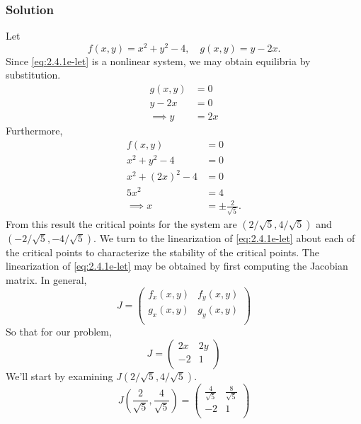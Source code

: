 \documentclass[12pt]{article}
\begin{document}
\subsubsection*{Solution}
Let
\begin{equation}
  \label{eq:2.4.1e-let}
  f(x,y)=x^2+y^2-4,\quad g(x,y)=y-2x.
\end{equation}
Since \cref{eq:2.4.1e-let} is a nonlinear system, we may obtain equilibria by
substitution.
\begin{equation*}
  \begin{aligned}
    g(x,y) &= 0 \\
    y - 2x &= 0 \\
    \implies y &= 2x
  \end{aligned}
\end{equation*}
Furthermore,
\begin{equation*}
  \begin{aligned}
    f(x,y) &= 0 \\
    x^2+y^2-4 &= 0 \\
    x^2 + {(2x)}^2 - 4 &= 0 \\
    5x^2 &= 4 \\
    \implies x &= \pm\frac{2}{\sqrt{5}}.
  \end{aligned}
\end{equation*}
From this result the critical points for the system are
$(2/\sqrt{5},4/\sqrt{5})$ and $(-2/\sqrt{5},-4/\sqrt{5})$. We turn to the
linearization of \cref{eq:2.4.1e-let} about each of the critical points to
characterize the stability of the critical points. The linearization of
\cref{eq:2.4.1e-let} may be obtained by first computing the Jacobian matrix. In
general,
\begin{equation*}
  J =
  \begin{pmatrix}
    f_x(x,y) & f_y(x,y) \\
    g_x(x,y) & g_y(x,y) \\
  \end{pmatrix}
\end{equation*}
So that for our problem,
\begin{equation*}
  J =
  \begin{pmatrix}
    2x & 2y \\ -2 & 1 \\
  \end{pmatrix}
\end{equation*}
We'll start by examining $J(2/\sqrt{5},4/\sqrt{5})$.
\begin{equation*}
  J\left(\frac{2}{\sqrt{5}},\frac{4}{\sqrt{5}}\right) =
  \begin{pmatrix}
    \frac{4}{\sqrt{5}} & \frac{8}{\sqrt{5}} \\ -2 & 1 \\
  \end{pmatrix}
\end{equation*}
\end{document}
